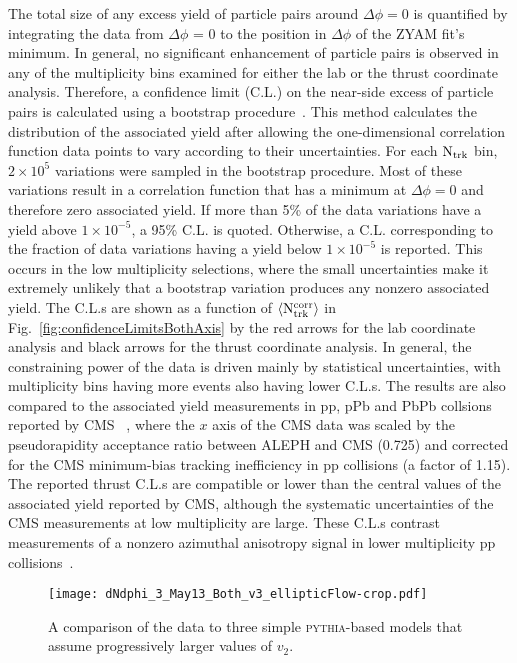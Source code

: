 \documentclass[aps,prl,twocolumn,superscriptaddress,groupedaddress]{revtex4}  %
\begin{document}
The total size of any excess yield of particle pairs around $\Delta\phi = 0$ is quantified by integrating the data from $\Delta\phi$ = 0 to the position in $\Delta\phi$ of the ZYAM fit's minimum. In general, no significant enhancement of particle pairs is observed in any of the multiplicity bins examined for either the lab or the thrust coordinate analysis. Therefore, a confidence limit (C.L.) on the near-side excess of particle pairs is calculated using a bootstrap procedure~\cite{efron1979}.  This method calculates the distribution of the associated yield after allowing the one-dimensional correlation function data points to vary according to their uncertainties. For each ${\rm N}_{\rm trk}$ bin, $2 \times 10^5$ variations were sampled in the bootstrap procedure. Most of these variations result in a correlation function that has a minimum at $\Delta \phi = 0$ and therefore zero associated yield.  If more than 5\% of the data variations have a yield above $1\times 10^{-5}$, a 95\% C.L. is quoted.  Otherwise, a C.L. corresponding to the fraction of data variations having a yield below $1\times 10^{-5}$ is reported.  This occurs in the low multiplicity selections, where the small uncertainties make it extremely unlikely that a bootstrap variation produces any nonzero associated yield.  The C.L.s are shown as a function of $\left \langle {\rm N}_{\mathrm{trk}}^{\mathrm{corr}} \right \rangle$ in Fig.~\ref{fig:confidenceLimitsBothAxis} by the red arrows for the lab coordinate analysis and black arrows for the thrust coordinate analysis.  In general, the constraining power of the data is driven mainly by statistical uncertainties, with multiplicity bins having more events also having lower C.L.s. The results are also compared to the associated yield measurements in pp, pPb and PbPb collsions reported by CMS ~\cite{Khachatryan:2010gv,CMS:2012qk,Khachatryan:2015lva}, where the $x$ axis of the CMS data was scaled by the pseudorapidity acceptance ratio between ALEPH and CMS (0.725) and corrected for the CMS minimum-bias tracking inefficiency in pp collisions (a factor of 1.15). The reported thrust C.L.s are compatible or lower than the central values of the associated yield reported by CMS, although the systematic uncertainties of the CMS measurements at low multiplicity are large. These C.L.s contrast measurements of a nonzero azimuthal anisotropy signal in lower multiplicity pp collisions~\cite{Aaboud:2016yar,Khachatryan:2016txc}.

\begin{figure}[!t]
\begin{center}
\texttt{[image: dNdphi\_3\_May13\_Both\_v3\_ellipticFlow-crop.pdf]}
\caption{ A comparison of the data to three simple \textsc{pythia}-based models that assume progressively larger values of $v_{2}$.}
\label{fig:v2Comparison} 
\end{center}
\end{figure}
\end{document}
